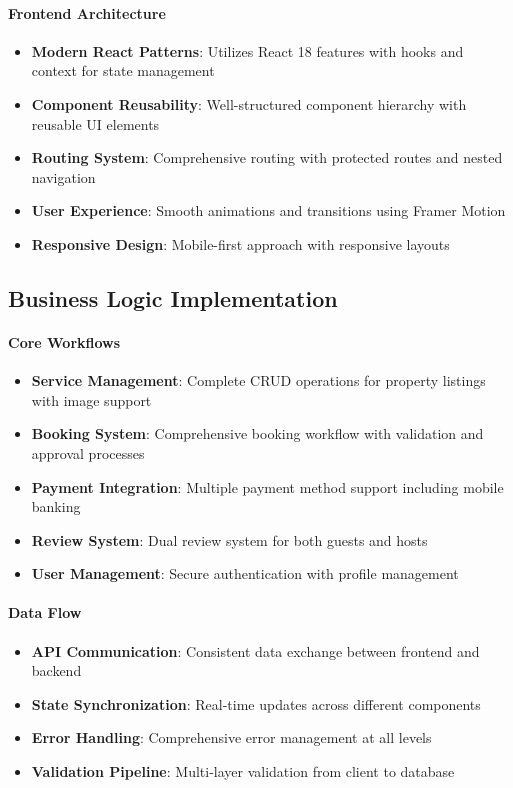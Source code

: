 \documentclass[12pt,a4paper]{article}
\begin{document}
\paragraph{Frontend Architecture}
\begin{itemize}
\item \textbf{Modern React Patterns}: Utilizes React 18 features with hooks and context for state management
\item \textbf{Component Reusability}: Well-structured component hierarchy with reusable UI elements
\item \textbf{Routing System}: Comprehensive routing with protected routes and nested navigation
\item \textbf{User Experience}: Smooth animations and transitions using Framer Motion
\item \textbf{Responsive Design}: Mobile-first approach with responsive layouts
\end{itemize}

\subsection{Business Logic Implementation}
\label{subsec:business-implementation}

\paragraph{Core Workflows}
\begin{itemize}
\item \textbf{Service Management}: Complete CRUD operations for property listings with image support
\item \textbf{Booking System}: Comprehensive booking workflow with validation and approval processes
\item \textbf{Payment Integration}: Multiple payment method support including mobile banking
\item \textbf{Review System}: Dual review system for both guests and hosts
\item \textbf{User Management}: Secure authentication with profile management
\end{itemize}

\paragraph{Data Flow}
\begin{itemize}
\item \textbf{API Communication}: Consistent data exchange between frontend and backend
\item \textbf{State Synchronization}: Real-time updates across different components
\item \textbf{Error Handling}: Comprehensive error management at all levels
\item \textbf{Validation Pipeline}: Multi-layer validation from client to database
\end{itemize}
\end{document}
